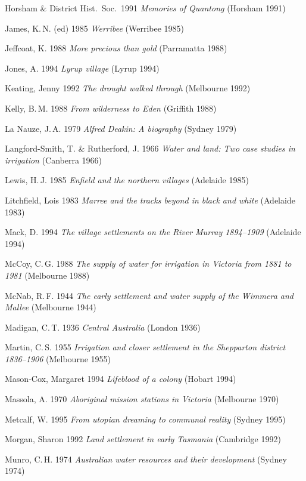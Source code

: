 Horsham \& District Hist.\ Soc.\ 1991 \textit{Memories of Quantong}
(Horsham 1991)

James, K.\,N. (ed) 1985 \textit{Werribee} (Werribee 1985)

Jeffcoat, K. 1988 \textit{More precious than gold} (Parramatta 1988)

Jones, A. 1994 \textit{Lyrup village} (Lyrup 1994)

Keating, Jenny 1992 \textit{The drought walked through} (Melbourne
1992)

Kelly, B.\,M. 1988 \textit{From wilderness to Eden} (Griffith 1988)

La Nauze, J.\,A. 1979 \textit{Alfred Deakin: A biography} (Sydney
1979)

Langford-Smith, T. \& Rutherford, J. 1966 \textit{Water and land: Two
case studies in irrigation} (Canberra 1966)

Lewis, H.\,J. 1985 \textit{Enfield and the northern villages}
(Adelaide 1985)

Litchfield, Lois 1983 \textit{Marree and the tracks beyond in black
and white} (Adelaide 1983)

Mack, D.  1994 \textit{The village settlements on the River Murray
1894--1909} (Adelaide 1994)

McCoy, C.\,G.  1988 \textit{The supply of water for irrigation in
Victoria from 1881 to 1981} (Melbourne 1988)

McNab, R.\,F. 1944 \textit{The early settlement and water supply of
the Wimmera and Mallee} (Melbourne 1944)

Madigan, C.\,T. 1936 \textit{Central Australia} (London 1936)

Martin, C.\,S.  1955 \textit{Irrigation and closer settlement in the
Shepparton district 1836--1906} (Melbourne 1955)

Mason-Cox, Margaret 1994 \textit{Lifeblood of a colony} (Hobart 1994)

Massola, A. 1970 \textit{Aboriginal mission stations in Victoria}
(Melbourne 1970)

Metcalf, W. 1995 \textit{From utopian dreaming to communal reality}
(Sydney 1995)

Morgan, Sharon 1992 \textit{Land settlement in early Tasmania}
(Cambridge 1992)

Munro, C.\,H. 1974 \textit{Australian water resources and their
development} (Sydney 1974)

